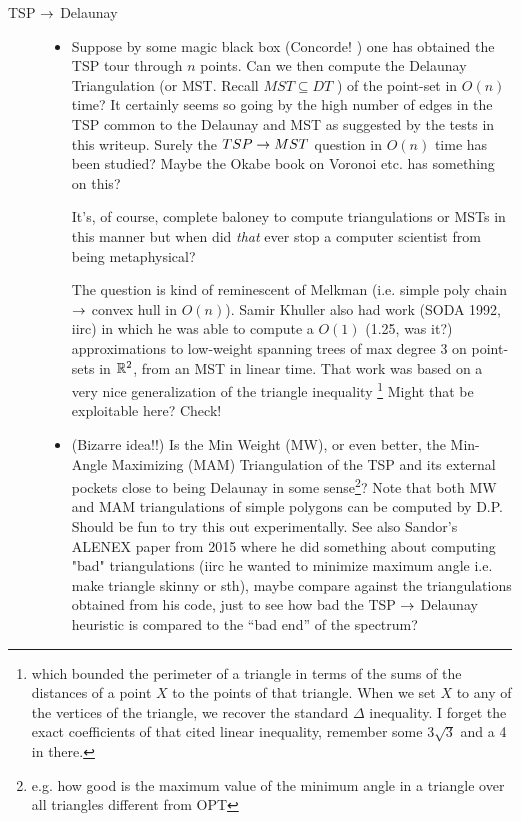\begin{appendices}
\begin{description}
\item[\color{red} TSP $\rightarrow$ Delaunay] 

\begin{itemize}
   \item  Suppose by some magic black box (Concorde! \Winkey) one has obtained the TSP tour through $n$ points.  
          Can we then compute the Delaunay Triangulation (or MST. Recall $MST \subseteq DT$  ) of the point-set 
          in $O(n)$ time? It certainly seems so going by the high number of edges in the TSP common to the Delaunay 
          and MST as suggested by the tests in this writeup. Surely the $TSP \rightarrow MST$ question in $O(n)$ time has been studied?
          Maybe the Okabe book on Voronoi etc. has something on this? 

          
          It's, of course, complete baloney to compute triangulations or MSTs in this manner but when did \textit{that} ever stop a computer scientist 
          from being metaphysical?

          The question is kind of reminescent of Melkman (i.e. simple poly chain $\rightarrow$ convex hull in $O(n)$). Samir Khuller also had work (SODA 1992, iirc) 
          in which he was able to compute a $O(1)$ (1.25, was it?) approximations to low-weight spanning trees of max degree 3 on point-sets in $\mathbb{R}^2$, 
          from an MST in linear time. That work was based on a very nice generalization of the triangle inequality 
          \footnote{which bounded the perimeter of a triangle in terms of the sums of the distances of a point $X$ to the points of that triangle. When we set $X$ to any of the vertices of the triangle, we recover the standard $\Delta$ inequality. I forget the exact coefficients of that cited linear inequality, remember some $3 \sqrt{3}$ and a 4 in there.}
          Might that be exploitable here? Check! 


   \item (Bizarre idea!!) Is the Min Weight (MW), or even better, the Min-Angle Maximizing (MAM) Triangulation of the TSP and its external pockets close 
          to being Delaunay in some sense\footnote{e.g. how good is the maximum value of the minimum angle in a triangle over all triangles different from OPT}?  
          Note that both MW and MAM triangulations of simple polygons can be computed by D.P. Should be fun to try this out experimentally. See also Sandor's 
          ALENEX paper from 2015 where he did something about computing "bad" triangulations (iirc he wanted to minimize maximum angle i.e. make triangle skinny or sth), 
          maybe compare against the triangulations obtained from his code, just to see how bad the TSP $\rightarrow$ Delaunay heuristic is compared 
          to the ``bad end'' of the spectrum? 
\end{itemize}  


\end{description}
\end{appendices}

